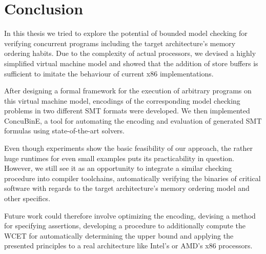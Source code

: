\section{Conclusion}


In this thesis we tried to explore the potential of bounded model checking for verifying concurrent programs
including the target architecture's memory ordering habits.
Due to the complexity of actual processors, we devised a highly simplified virtual machine model
and showed that the addition of store buffers is sufficient to imitate the behaviour of current x86 implementations.

After designing a formal framework for the execution of arbitrary programs on this virtual machine model,
encodings of the corresponding model checking problems in two different SMT formats were developed.
We then implemented ConcuBinE, a tool for automating the encoding and evaluation of generated SMT formulas using state-of-the-art solvers.

Even though experiments show the basic feasibility of our approach, the rather huge runtimes for even small examples puts its practicability in question.
However, we still see it as an opportunity to integrate a similar checking procedure into compiler toolchains, automatically verifying the binaries of critical software with regards to the target architecture's memory ordering model and other specifics.

Future work could therefore involve optimizing the encoding,
devising a method for specifying assertions,
developing a procedure to additionally compute the WCET for automatically determining the upper bound and applying the presented principles to a real architecture like Intel's or AMD's x86 processors.
